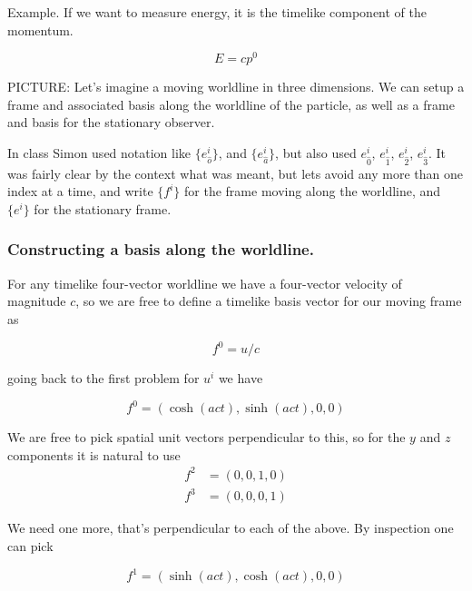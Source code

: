 Example.  If we want to measure energy, it is the timelike component of the momentum.

\begin{equation}\label{eqn:relativisticElectrodynamicsT2:500}
E = c p^0
\end{equation}

PICTURE:  Let's imagine a moving worldline in three dimensions.  We can setup a frame and associated basis along the worldline of the particle, as well as a frame and basis for the stationary observer.

In class Simon used notation like $\{ e_{\hat{o}}^i \}$, and $\{ e_{\hat{a}}^i \}$, but also used $e_{\hat{0}}^i$, $e_{\hat{1}}^i$, $e_{\hat{2}}^i$, $e_{\hat{3}}^i$.  It was fairly clear by the context what was meant, but lets avoid any more than one index at a time, and write $\{ f^i \}$ for the frame moving along the worldline, and $\{ e^i \}$ for the stationary frame.

\subsubsection{Constructing a basis along the worldline.}

For any timelike four-vector worldline we have a four-vector velocity of magnitude $c$, so we are free to define a timelike basis vector for our moving frame as

\begin{equation}\label{eqn:relativisticElectrodynamicsT2:510}
f^0 = u / c
\end{equation}

going back to the first problem for $u^i$ we have

\begin{equation}\label{eqn:relativisticElectrodynamicsT2:599b}
f^0 = ( \cosh( a c t ), \sinh( a c t), 0, 0 ) 
\end{equation}

We are free to pick spatial unit vectors perpendicular to this, so for the $y$ and $z$ components it is natural to use
\begin{align}\label{eqn:relativisticElectrodynamicsT2:599a}
f^2 &= ( 0, 0, 1, 0 ) \\
f^3 &= ( 0, 0, 0, 1 )
\end{align}

We need one more, that's perpendicular to each of the above.  By inspection one can pick

\begin{equation}\label{eqn:relativisticElectrodynamicsT2:599}
f^1 = ( \sinh( a c t ), \cosh( a c t), 0, 0) 
\end{equation}

